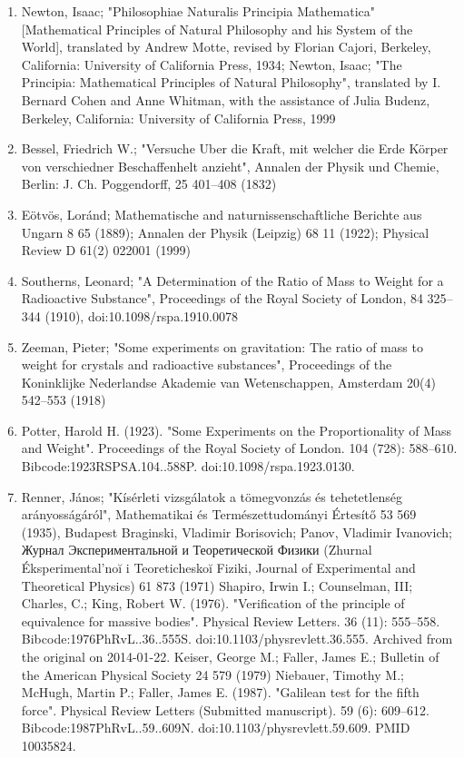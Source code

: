 \begin{enumerate}
\item Newton, Isaac; "Philosophiae Naturalis Principia Mathematica" [Mathematical Principles of Natural Philosophy and his System of the World], translated by Andrew Motte, revised by Florian Cajori, Berkeley, California: University of California Press, 1934; Newton, Isaac; "The Principia: Mathematical Principles of Natural Philosophy", translated by I. Bernard Cohen and Anne Whitman, with the assistance of Julia Budenz, Berkeley, California: University of California Press, 1999
\item Bessel, Friedrich W.; "Versuche Uber die Kraft, mit welcher die Erde Körper von verschiedner Beschaffenhelt anzieht", Annalen der Physik und Chemie, Berlin: J. Ch. Poggendorff, 25 401–408 (1832)
\item Eötvös, Loránd; Mathematische and naturnissenschaftliche Berichte aus Ungarn 8 65 (1889); Annalen der Physik (Leipzig) 68 11 (1922); Physical Review D 61(2) 022001 (1999)
\item Southerns, Leonard; "A Determination of the Ratio of Mass to Weight for a Radioactive Substance", Proceedings of the Royal Society of London, 84 325–344 (1910), doi:10.1098/rspa.1910.0078
\item Zeeman, Pieter; "Some experiments on gravitation: The ratio of mass to weight for crystals and radioactive substances", Proceedings of the Koninklijke Nederlandse Akademie van Wetenschappen, Amsterdam 20(4) 542–553 (1918)
\item Potter, Harold H. (1923). "Some Experiments on the Proportionality of Mass and Weight". Proceedings of the Royal Society of London. 104 (728): 588–610. Bibcode:1923RSPSA.104..588P. doi:10.1098/rspa.1923.0130.
\item Renner, János; "Kísérleti vizsgálatok a tömegvonzás és tehetetlenség arányosságáról", Mathematikai és Természettudományi Értesítő 53 569 (1935), Budapest
Braginski, Vladimir Borisovich; Panov, Vladimir Ivanovich; Журнал Экспериментальной и Теоретической Физики (Zhurnal Éksperimental’noĭ i Teoreticheskoĭ Fiziki, Journal of Experimental and Theoretical Physics) 61 873 (1971)
Shapiro, Irwin I.; Counselman, III; Charles, C.; King, Robert W. (1976). "Verification of the principle of equivalence for massive bodies". Physical Review Letters. 36 (11): 555–558. Bibcode:1976PhRvL..36..555S. doi:10.1103/physrevlett.36.555. Archived from the original on 2014-01-22.
Keiser, George M.; Faller, James E.; Bulletin of the American Physical Society 24 579 (1979)
Niebauer, Timothy M.; McHugh, Martin P.; Faller, James E. (1987). "Galilean test for the fifth force". Physical Review Letters (Submitted manuscript). 59 (6): 609–612. Bibcode:1987PhRvL..59..609N. doi:10.1103/physrevlett.59.609. PMID 10035824.

\end{enumerate}

